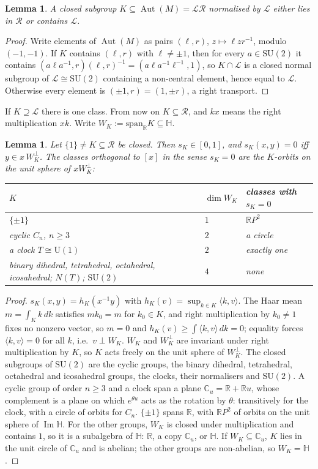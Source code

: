 \documentclass[aps,pra,onecolumn,superscriptaddress,nofootinbib,10pt]{revtex4-2}
\newtheorem{lemma}[theorem]{Lemma}
\theoremstyle{definition}
\theoremstyle{remark}
\newcommand{\R}{\mathbb{R}}
\newcommand{\C}{\mathbb{C}}
\newcommand{\HH}{\mathbb{H}}
\newcommand{\cL}{\mathcal{L}}
\newcommand{\cR}{\mathcal{R}}
\newcommand{\Aut}{\operatorname{Aut}}
\newcommand{\im}{\operatorname{Im}}
\newcommand{\ip}[2]{\langle #1,#2\rangle}
\newcommand{\SU}{\mathrm{SU}}
\newcommand{\U}{\mathrm{U}}
\begin{document}
\begin{lemma}\label{lem:normaliser}
A closed subgroup $K\subseteq\Aut(M)=\cL\cR$ normalised by $\cL$ either lies in $\cR$ or contains $\cL$.
\end{lemma}
\begin{proof}
Write elements of $\Aut(M)$ as pairs $(\ell,r)$, $z\mapsto\ell zr^{-1}$, modulo $(-1,-1)$.  If $K$ contains $(\ell,r)$ with
$\ell\ne\pm1$, then for every $a\in\SU(2)$ it contains $(a\ell a^{-1},r)(\ell,r)^{-1}=(a\ell a^{-1}\ell^{-1},1)$, so
$K\cap\cL$ is a closed normal subgroup of $\cL\cong\SU(2)$ containing a non-central element, hence equal to
$\cL$.  Otherwise every element is $(\pm1,r)=(1,\pm r)$, a right transport.
\end{proof}
If $K\supseteq\cL$ there is one class.  From now on $K\subseteq\cR$, and $kx$ means the right multiplication $xk$.
Write $W_K:=\mathrm{span}_\R K\subseteq\HH$.

\begin{lemma}\label{lem:classes}
Let $\{1\}\ne K\subseteq\cR$ be closed.  Then $s_K\in[0,1]$, and $s_K(x,y)=0$ iff $y\in x\,W_K^\perp$.  The classes
orthogonal to $[x]$ in the sense $s_K=0$ are the $K$-orbits on the unit sphere of $xW_K^\perp$:
\begin{center}\footnotesize
\begin{tabular}{@{}lll@{}}
\toprule
$K$ & $\dim W_K$ & classes with $s_K=0$\\
\midrule
$\{\pm1\}$ & $1$ & $\R P^2$ \\
cyclic $C_n$, $n\ge3$ & $2$ & a circle \\
a clock $T\cong\U(1)$ & $2$ & exactly one \\
binary dihedral, tetrahedral, octahedral, icosahedral; $N(T)$; $\SU(2)$ & $4$ & none \\
\bottomrule
\end{tabular}
\end{center}
\end{lemma}
\begin{proof}
$s_K(x,y)=h_K(x^{-1}y)$ with $h_K(v)=\sup_{k\in K}\ip kv$.  The Haar mean $m=\int_Kk\,dk$ satisfies $mk_0=m$ for
$k_0\in K$, and right multiplication by $k_0\ne1$ fixes no nonzero vector, so $m=0$ and
$h_K(v)\ge\int\ip kv\,dk=0$; equality forces $\ip kv=0$ for all $k$, i.e.\ $v\perp W_K$.  $W_K$ and $W_K^\perp$ are
invariant under right multiplication by $K$, so $K$ acts freely on the unit sphere of $W_K^\perp$.  The
closed subgroups of $\SU(2)$ are the cyclic groups, the binary dihedral, tetrahedral, octahedral and
icosahedral groups, the clocks, their normalisers and $\SU(2)$.  A cyclic group of order $n\ge3$ and a clock
span a plane $\C_u=\R+\R u$, whose complement is a plane on which $e^{\theta u}$ acts as the rotation by
$\theta$: transitively for the clock, with a circle of orbits for $C_n$.  $\{\pm1\}$ spans $\R$, with $\R P^2$
of orbits on the unit sphere of $\im\HH$.  For the other groups, $W_K$ is closed under multiplication and
contains $1$, so it is a subalgebra of $\HH$: $\R$, a copy $\C_u$, or $\HH$.  If $W_K\subseteq\C_u$, $K$ lies in the unit
circle of $\C_u$ and is abelian; the other groups are non-abelian, so $W_K=\HH$.
\end{proof}
\end{document}
